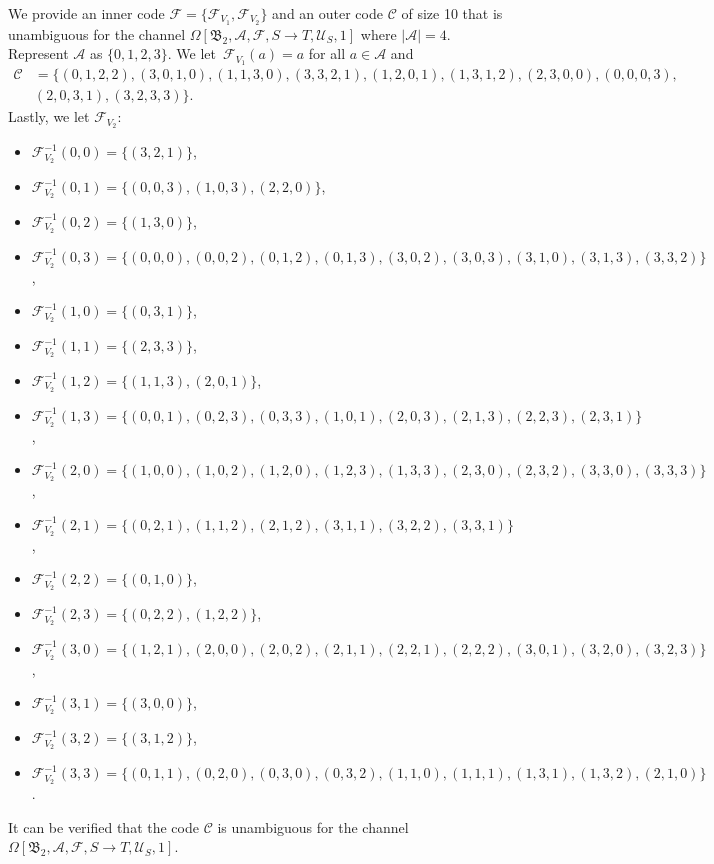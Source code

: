 \documentclass[11pt,a4paper]{article}
\theoremstyle{definition}
\newcommand{\mC}{\mathcal{C}}
\newcommand{\mA}{\mathcal{A}}
\newcommand{\mF}{\mathcal{F}}
\newcommand{\mU}{\mathcal{U}}
\begin{document}
We provide an inner code $\mF= \{\mF_{V_1},\mF_{V_2}\}$ and an outer code $\mC$ of size 10 that is
unambiguous for the channel $\Omega[\mathfrak{B}_2,\mA,\mF,S \to T,\mU_S,1]$ where $\lvert \mA \rvert=4$. Represent $\mA$ as $\{0,1,2,3\}$. We let~$\mF_{V_1}(a)=a$ for all $a \in \mA$ and 
\begin{align*}
\mC &=\{(0,1,2,2),(3,0,1,0),(1,1,3,0),(3,3,2,1),(1,2,0,1),(1,3,1,2),(2,3,0,0),(0,0,0,3),\\&(2,0,3,1),(3,2,3,3)\}.
\end{align*}
Lastly, we let $\mF_{V_2}$:
\begin{itemize}
    \item $\mF_{V_2}^{-1}(0,0) = \{(3,2,1)\}$,
    \item $\mF_{V_2}^{-1}(0,1) = \{(0,0,3), (1,0,3), (2,2,0)\}$,
    \item $\mF_{V_2}^{-1}(0,2) = \{(1,3,0)\}$,
    \item $\mF_{V_2}^{-1}(0,3) = \{(0,0,0), (0,0,2), (0,1,2), (0,1,3), (3,0,2), (3,0,3), (3,1,0), (3,1,3), (3,3,2)\}$,
    \item $\mF_{V_2}^{-1}(1,0) = \{(0,3,1)\}$,
    \item $\mF_{V_2}^{-1}(1,1) = \{(2,3,3)\}$,
    \item $\mF_{V_2}^{-1}(1,2) = \{(1,1,3), (2,0,1)\}$,
    \item $\mF_{V_2}^{-1}(1,3) = \{(0,0,1), (0,2,3), (0,3,3), (1,0,1), (2,0,3), (2,1,3), (2,2,3), (2,3,1)\}$,
    \item $\mF_{V_2}^{-1}(2,0) = \{(1,0,0), (1,0,2), (1,2,0), (1,2,3), (1,3,3), (2,3,0), (2,3,2), (3,3,0), (3,3,3)\}$,
    \item $\mF_{V_2}^{-1}(2,1) = \{(0,2,1), (1,1,2), (2,1,2), (3,1,1), (3,2,2), (3,3,1)\}$,
    \item $\mF_{V_2}^{-1}(2,2) = \{(0,1,0)\}$,
    \item $\mF_{V_2}^{-1}(2,3) = \{(0,2,2), (1,2,2)\}$,
    \item $\mF_{V_2}^{-1}(3,0) = \{(1,2,1), (2,0,0), (2,0,2), (2,1,1), (2,2,1), (2,2,2), (3,0,1), (3,2,0), (3,2,3)\}$,
    \item $\mF_{V_2}^{-1}(3,1) = \{(3,0,0)\}$,
    \item $\mF_{V_2}^{-1}(3,2) = \{(3,1,2)\}$,
    \item $\mF_{V_2}^{-1}(3,3) = \{(0,1,1), (0,2,0), (0,3,0), (0,3,2), (1,1,0), (1,1,1), (1,3,1), (1,3,2), (2,1,0)\}$.
\end{itemize}
It can be verified that the code $\mC$ is unambiguous for the channel
$\Omega[\mathfrak{B}_2,\mA,\mF,S \to T,\mU_S,1]$. 
\end{document}
